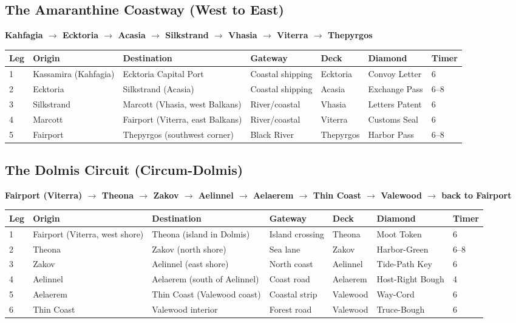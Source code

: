 \documentclass[11pt,letterpaper,twoside]{book}
\begin{document}
\subsection{The Amaranthine Coastway (West to East)}

\textbf{Kahfagia $\rightarrow$ Ecktoria $\rightarrow$ Acasia $\rightarrow$ Silkstrand $\rightarrow$ Vhasia $\rightarrow$ Viterra $\rightarrow$ Thepyrgos}

\begin{longtable}{|p{1.5cm}|p{2.5cm}|p{2.5cm}|p{1.5cm}|p{2cm}|p{1.5cm}|}
\hline
\textbf{Leg} & \textbf{Origin} & \textbf{Destination} & \textbf{Gateway} & \textbf{Deck} & \textbf{Diamond} & \textbf{Timer} \\
 & Kassamira (Kahfagia) & Ecktoria Capital Port & Coastal shipping & Ecktoria & Convoy Letter & 6 \\
2 & Ecktoria & Silkstrand (Acasia) & Coastal shipping & Acasia & Exchange Pass & 6--8 \\
3 & Silkstrand & Marcott (Vhasia, west Balkans) & River/coastal & Vhasia & Letters Patent & 6 \\
4 & Marcott & Fairport (Viterra, east Balkans) & River/coastal & Viterra & Customs Seal & 6 \\
5 & Fairport & Thepyrgos (southwest corner) & Black River & Thepyrgos & Harbor Pass & 6--8 \\
\hline
\end{longtable}

\subsection{The Dolmis Circuit (Circum-Dolmis)}

\textbf{Fairport (Viterra) $\rightarrow$ Theona $\rightarrow$ Zakov $\rightarrow$ Aelinnel $\rightarrow$ Aelaerem $\rightarrow$ Thin Coast $\rightarrow$ Valewood $\rightarrow$ back to Fairport}

\begin{longtable}{|p{1.5cm}|p{2.5cm}|p{2.5cm}|p{1.5cm}|p{2cm}|p{1.5cm}|}
\hline
\textbf{Leg} & \textbf{Origin} & \textbf{Destination} & \textbf{Gateway} & \textbf{Deck} & \textbf{Diamond} & \textbf{Timer} \\
 & Fairport (Viterra, west shore) & Theona (island in Dolmis) & Island crossing & Theona & Moot Token & 6 \\
2 & Theona & Zakov (north shore) & Sea lane & Zakov & Harbor-Green & 6--8 \\
3 & Zakov & Aelinnel (east shore) & North coast & Aelinnel & Tide-Path Key & 6 \\
4 & Aelinnel & Aelaerem (south of Aelinnel) & Coast road & Aelaerem & Host-Right Bough & 4 \\
5 & Aelaerem & Thin Coast (Valewood coast) & Coastal strip & Valewood & Way-Cord & 6 \\
6 & Thin Coast & Valewood interior & Forest road & Valewood & Truce-Bough & 6 \\
\hline
\end{longtable}
\end{document}
